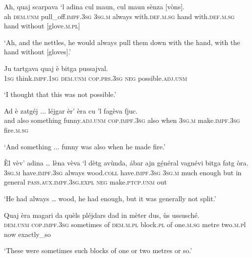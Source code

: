 \begin{linenumbers}
\gll  Ah, quaj scarpava `l adina cul maun, cul maun sènza [vòns].  \\
ah  \textsc{dem.unm} pull\_off.\textsc{impf.3sg} \textsc{3sg.m} always with.\textsc{def.m.sg} hand with.\textsc{def.m.sg} hand without [glove.\textsc{m.pl}]  \\
\end{linenumbers}
\medskip
\glt `Ah, and the nettles, he would always pull them down with the hand, with the hand without [gloves].'
\medskip

\begin{linenumbers}
\gll  Ju tartgava quaj è bitga pussajval.  \\
 \textsc{1sg} think.\textsc{impf.1sg} \textsc{dem.unm} \textsc{cop.prs.3sg} \textsc{neg} possible.\textsc{adj.unm}  \\ 
\end{linenumbers} 
\medskip
\glt `I thought that this was not possible.'
\medskip

\begin{linenumbers}
\gll  Ad è zatgéj ... léjgar èr’ èra cu 'l fagèva fjuc.  \\
 and also something {} funny.\textsc{adj.unm} \textsc{cop.impf.3sg} also when \textsc{3sg.m} make.\textsc{impf.3sg} fire.\textsc{m.sg} \\
\end{linenumbers}
\medskip
\glt `And something ... funny was also when he made fire.'
\medskip

\largerpage
\begin{linenumbers}
\gll Èl vèv’ adina … lèna vèva `l dètg avùnda, ábar ajn gé̱néral vagnévi bitga fatg òra. \\
 \textsc{3sg.m} have.\textsc{impf.3sg} always {} wood.\textsc{coll} have.\textsc{impf.3sg} \textsc{3sg.m} much enough but in general \textsc{pass.aux.impf.3sg.expl} \textsc{neg} make.\textsc{ptcp.unm} out  \\
\end{linenumbers}
\medskip
\glt `He had always … wood, he  had enough, but it was generally not split.'

\clearpage

\begin{linenumbers}
\gll  Quaj èra magari da quèls pléjdars dad in mèter dus, ùs ussusché. \\
 \textsc{dem.unm} \textsc{cop.impf.3sg} sometimes of \textsc{dem.m.pl} block.\textsc{pl} of one.\textsc{m.sg} metre two.\textsc{m.p}l now exactly\_so  \\
\end{linenumbers}
\medskip
\glt `These were sometimes such blocks of one or two metres or so.'
\medskip

